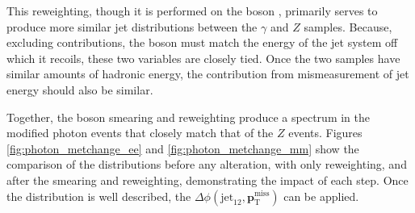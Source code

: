 This reweighting, though it is performed on the boson \pt, primarily serves to produce more similar jet distributions between the $\gamma$ and $Z$ samples. Because, excluding \met contributions, the boson \pt must match the energy of the jet system off which it recoils, these two variables are closely tied. Once the two samples have similar amounts of hadronic energy, the \met contribution from mismeasurement of jet energy should also be similar. 

Together, the boson smearing and \pt reweighting produce a \met spectrum in the modified photon events that closely match that of the $Z$ events. Figures \ref{fig:photon_metchange_ee} and \ref{fig:photon_metchange_mm} show the comparison of the \met distributions before any alteration, with only \pt reweighting, and after the smearing and reweighting, demonstrating the impact of each step. Once the \met distribution is well described, the $\Delta\phi(\text{jet}_{12},{\boldsymbol p}_{\mathrm{T}}^\mathrm{miss})$ can be applied. 


